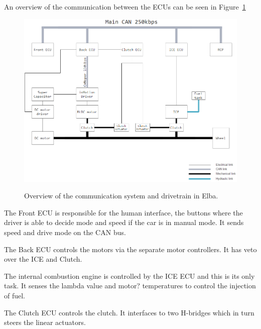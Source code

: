 An overview of the communication between the ECUs can be seen in Figure~\ref{fig:communication_overview}

\begin{figure}[H]
    \centering\label{fig:communication_overview}
    \includegraphics[width=1\textwidth]{./img/elba_communication_overview}
    \caption{Overview of the communication system and drivetrain in Elba.}
\end{figure}

The Front ECU is responsible for the human interface, the buttons where the
driver is able to decide mode and speed if the car is in manual mode. It sends
speed and drive mode on the CAN bus.

The Back ECU controls the motors via the separate motor controllers. It has
veto over the ICE and Clutch.

The internal combustion engine is controlled by the ICE ECU and this is its
only task. It senses the lambda value and motor? temperatures to control the
injection of fuel.

The Clutch ECU controls the clutch. It interfaces to two H-bridges which in turn
steers the linear actuators.  

